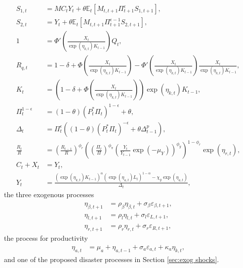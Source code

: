 \documentclass[12 pt, oneside]{article}
\theoremstyle{definition}
\theoremstyle{definition}
\theoremstyle{definition}
\newcommand{\E}{\mathbb{E}}
\begin{document}
\begin{align}
  S_{1, t} & = MC_t Y_t + \theta\E_t[M_{t, t + 1} \Pi_{t + 1}^\epsilon S_{1, t + 1}],\\
  \label{eq:denominator recursion eqm}
  S_{2, t} & =  Y_t + \theta\E_t[M_{t, t + 1} \Pi_{t + 1}^{\epsilon - 1} S_{2, t + 1}],\\
  \label{eq:tobins q eqm}
  1 & = \Phi'\left(\frac{X_t}{\exp(\eta_{k, t})K_{t - 1}}\right) Q_t,\\
  \label{eq:Rq defn eqm}
  R_{q, t} & = 1 - \delta + \Phi\left(\frac{X_t}{\exp(\eta_{k, t})K_{t - 1}}\right) - \Phi'\left(\frac{X_t}{\exp(\eta_{k, t})K_{t - 1}}\right)\frac{X_t}{\exp(\eta_{k, t})K_{t - 1}},\\
  \label{eq:law of motion capital eqm}
  K_t & = \left(1 - \delta + \Phi\left(\frac{X_t}{\exp(\eta_{k, t})K_{t - 1}}\right)\right)\exp(\eta_{k, t})K_{t - 1},\\
  \label{eq:inflation from optimal reset price eqm}
  \Pi_t^{ 1 - \epsilon} & = (1 - \theta) (P_t^*\Pi_t)^{1 - \epsilon} + \theta,\\
  \label{eq:price dispersion evol eqm}
  \Delta_t & = \Pi_t^{\epsilon}((1 - \theta) (P_t^* \Pi_t)^{-\epsilon} + \theta \Delta_{t - 1}^p),\\
  \label{eq:taylor rule eqm}
  \frac{R_t}{R} & =  \left(\frac{R_{t - 1}}{R}\right)^{\phi_r}\left(\left(\frac{\Pi_t}{\Pi}\right)^{\phi_\pi}\left(\frac{Y_t}{Y_{t - 1}}\exp(-\mu_Y)\right)^{\phi_y}\right)^{1 - \phi_r}\exp(\eta_{r, t}),\\
  \label{eq:output market clearing eqm}
  C_t + X_t & = Y_t,\\
  \label{eq:aggregate supply eqm}
  Y_t & = \frac{(\exp(\eta_{k, t}) K_{t - 1})^{\alpha}(\exp(\eta_{a, t})L_t)^{1 - \alpha} - \chi_y \exp(\eta_{a, t})}{\Delta_t},
\end{align}
the three exogenous processes
\begin{align}
  \label{eq:ar1 beta}
  \eta_{\beta, t + 1} & = \rho_\beta\eta_{\beta, t} + \sigma_\beta \varepsilon_{\beta, t + 1},\\
  \eta_{l, t + 1} & = \rho_l\eta_{l, t} + \sigma_l \varepsilon_{L, t + 1},\\
  \label{eq:ar1 R}
  \eta_{r, t + 1} & = \rho_r\eta_{r, t} + \sigma_r \varepsilon_{R, t + 1},
\end{align}
the process for productivity
\begin{align}
  \label{eq:productivity process eqm}
  \eta_{a, t} & = \mu_a + \eta_{a, t - 1} + \sigma_a \varepsilon_{a, t} + \kappa_a\eta_{k, t},
\end{align}
and one of the proposed disaster processes in Section \ref{sec:exog shocks}.
\end{document}
